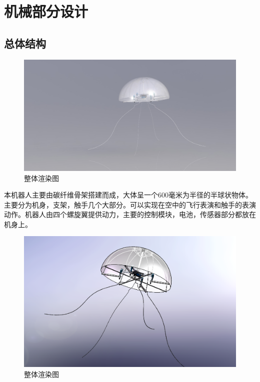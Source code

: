 \documentclass{ctexart}
\begin{document}
\section{机械部分设计}
\subsection{总体结构}
\begin{figure}[H]
\centering
    \includegraphics[width = \textwidth]{001}
    \caption{整体渲染图}\par
\end{figure}
本机器人主要由碳纤维骨架搭建而成，大体呈一个600毫米为半径的半球状物体。主要分为机身，支架，触手几个大部分。可以实现在空中的飞行表演和触手的表演动作。机器人由四个螺旋翼提供动力，主要的控制模块，电池，传感器部分都放在机身上。
\begin{figure}[H]
\centering
    \includegraphics[width = \textwidth]{002}
    \caption{整体渲染图}\par
\end{figure}
\end{document}
